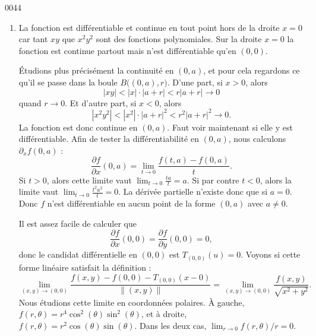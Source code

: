 
\begin{corrige}{0044}

\begin{enumerate}

\item
La fonction est différentiable et continue en tout point hors de la droite $x=0$ car tant $xy$ que $x^2y^2$ sont des fonctions polynomiales. Sur la droite $x=0$ la fonction est continue partout mais n'est différentiable qu'en $(0,0)$.

Étudions plus précisément la continuité en $(0,a)$, et pour cela regardons ce qu'il se passe dans la boule $B\big( (0,a),r \big)$. D'une part, si $x>0$, alors 
\begin{equation}
	| xy |<| x |\cdot| a+r |<r| a+r |\to 0
\end{equation}
quand $r\to 0$. Et d'autre part, si $x<0$, alors
\begin{equation}
	| x^2y^2 |<| x^2 |\cdot| a+r |^2<r^2| a+r |^2\to 0.
\end{equation}
La fonction est donc continue en $(0,a)$. Faut voir maintenant si elle y est différentiable. Afin de tester la différentiabilité en $(0,a)$, nous calculons $\partial_xf(0,a)$ :
\begin{equation}
	\frac{ \partial f }{ \partial x }(0,a)=\lim_{t\to 0}\frac{ f(t,a)-f(0,a) }{ t }.
\end{equation}
Si $t>0$, alors cette limite vaut $\lim_{t\to 0}\frac{ ta }{ t }=a$. Si par contre $t<0$, alors la limite vaut $\lim_{t\to 0}\frac{ t^2a^2 }{ t }=0$. La dérivée partielle n'existe donc que si $a=0$. Donc $f$ n'est différentiable en aucun point de la forme $(0,a)$ avec $a\neq 0$.

Il est assez facile de calculer que
\begin{equation}
	\frac{ \partial f }{ \partial x }(0,0)=\frac{ \partial f }{ \partial y }(0,0)=0,
\end{equation}
donc le candidat différentielle en $(0,0)$ est $T_{(0,0)}(u)=0$. Voyons si cette forme linéaire satisfait la définition :
\begin{equation}
	\lim_{(x,y)\to(0,0)}\frac{ f(x,y)-f(0,0)-T_{(0,0)}(x-0) }{ \| (x,y) \| }=\lim_{(x,y)\to (0,0)}\frac{ f(x,y) }{ \sqrt{x^2+y^2} }.
\end{equation}
Nous étudions cette limite en coordonnées polaires. À gauche, $f(r,\theta)=r^4\cos^2(\theta)\sin^2(\theta)$, et à droite, $f(r,\theta)=r^2\cos(\theta)\sin(\theta)$. Dans les deux cas, $\lim_{r\to 0}f(r,\theta)/r=0$. 


\end{enumerate}
\end{corrige}

